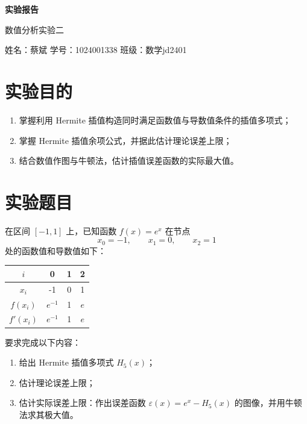 \documentclass[12pt,a4paper]{ctexart}
\begin{document}
\thispagestyle{empty}

\begin{center}
    {\bfseries 实验报告}

    \vspace{0.7em}
    {数值分析实验二}

    \vspace{1em}
    姓名：蔡斌 \qquad 学号：1024001338 \qquad 班级：\mbox{数学jd2401}
\end{center}

\section{实验目的}

\begin{enumerate}
    \item 掌握利用 Hermite 插值构造同时满足函数值与导数值条件的插值多项式；
    \item 掌握 Hermite 插值余项公式，并据此估计理论误差上限；
    \item 结合数值作图与牛顿法，估计插值误差函数的实际最大值。
\end{enumerate}

\section{实验题目}

在区间 $[-1,1]$ 上，已知函数 $f(x)=e^x$ 在节点
\[
x_0=-1,\qquad x_1=0,\qquad x_2=1
\]
处的函数值和导数值如下：
\begin{table}[H]
    \centering
    \begin{tabular}{cccc}
        \toprule
        $i$ & 0 & 1 & 2 \\
        \midrule
        $x_i$ & -1 & 0 & 1 \\
        $f(x_i)$ & $e^{-1}$ & 1 & $e$ \\
        $f'(x_i)$ & $e^{-1}$ & 1 & $e$ \\
        \bottomrule
    \end{tabular}
\end{table}

要求完成以下内容：
\begin{enumerate}
    \item 给出 Hermite 插值多项式 $H_5(x)$；
    \item 估计理论误差上限；
    \item 估计实际误差上限：作出误差函数 $\varepsilon(x)=e^x-H_5(x)$ 的图像，并用牛顿法求其极大值。
\end{enumerate}
\end{document}
